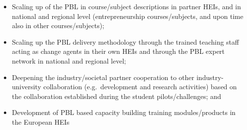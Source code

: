 \documentclass[
  11pt,
]{article}
\providecommand{\tightlist}{%
  \setlength{\itemsep}{0pt}\setlength{\parskip}{0pt}}
\begin{document}
\begin{itemize}
\tightlist
\item
  Scaling up of the PBL in course/subject descriptions in partner HEIs,
  and in national and regional level (entrepreneurship courses/subjects,
  and upon time also in other courses/subjects);
\item
  Scaling up the PBL delivery methodology through the trained teaching
  staff acting as change agents in their own HEIs and through the PBL
  expert network in national and regional level;
\item
  Deepening the industry/societal partner cooperation to other
  industry-university collaboration (e.g.~development and research
  activities) based on the collaboration established during the student
  pilots/challenges; and
\item
  Development of PBL based capacity building training modules/products
  in the European HEIs
\end{itemize}

\providecommand{\docline}[3]{\noalign{\global\setlength{\arrayrulewidth}{#1}}\arrayrulecolor[HTML]{#2}\cline{#3}}

\setlength{\tabcolsep}{2pt}

\renewcommand*{\arraystretch}{1.5}
\end{document}
